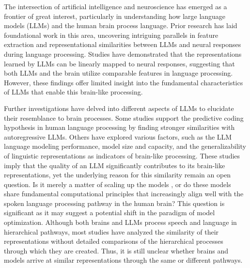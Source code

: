 The intersection of artificial intelligence and neuroscience has emerged as a frontier of great interest, particularly in understanding how large language models (LLMs) and the human brain process language. Prior research has laid foundational work in this area, uncovering intriguing parallels in feature extraction and representational similarities between LLMs and neural responses during language processing. Studies \cite{toneva2019interpreting, abnar2019blackbox, schrimpf2021neural, caucheteux2020language, hosseini2022artificial, anderson2021deep, caucheteux2021disentangling, caucheteux2022brains, sun2020neural} have demonstrated that the representations learned by LLMs can be linearly mapped to neural responses, suggesting that both LLMs and the brain utilize comparable features in language processing. However, these findings offer limited insight into the fundamental characteristics of LLMs that enable this brain-like processing.

Further investigations have delved into different aspects of LLMs to elucidate their resemblance to brain processes. Some studies \cite{goldstein2022shared, caucheteux2023evidence} support the predictive coding hypothesis in human language processing by finding stronger similarities with autoregressive LLMs. Others \cite{caucheteux2022brains, hosseini2022artificial, antonello2023scaling, antonello2023predictive} have explored various factors, such as the LLM language modeling performance, model size and capacity, and the generalizability of linguistic representations as indicators of brain-like processing. These studies imply that the quality of an LLM significantly contributes to its brain-like representations, yet the underlying reason for this similarity remain an open question. Is it merely a matter of scaling up the models \cite{antonello2023scaling}, or do these models share fundamental computational principles that increasingly align well with the spoken language processing pathway in the human brain? This question is significant as it may suggest a potential shift in the paradigm of model optimization. Although both brains \cite{hickok2007cortical, hasson2008hierarchy, lerner2011topographic, ding2017characterizing} and LLMs \cite{ethayarajh2019contextual, tenney2019bert} process speech and language in hierarchical pathways, most studies have analyzed the similarity of their representations without detailed comparisons of the hierarchical processes through which they are created. Thus, it is still unclear whether brains and models arrive at similar representations through the same or different pathways.


